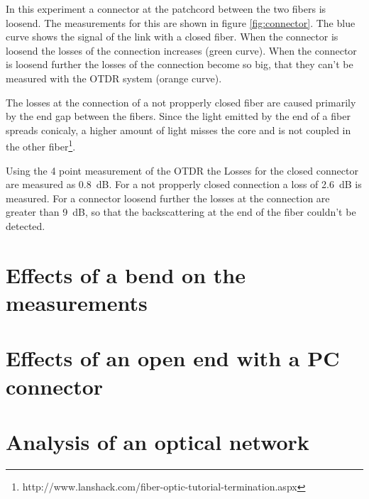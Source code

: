 In this experiment a connector at the patchcord between the two fibers is loosend. The measurements for this are shown in figure \ref{fig:connector}. The blue curve shows the signal of the link with a closed fiber. When the connector is loosend the losses of the connection increases (green curve). When the connector is loosend further the losses of the connection become so big, that they can't be measured with the OTDR system (orange curve). 

The losses at the connection of a not propperly closed fiber are caused primarily by the end gap between the fibers. Since the light emitted by the end of a fiber spreads conicaly, a higher amount of light misses the core and is not coupled in the other fiber\footnote[4]{http://www.lanshack.com/fiber-optic-tutorial-termination.aspx}.

Using the 4 point measurement of the OTDR the Losses for the closed connector are measured as 0.8~dB. For a not propperly closed connection a loss of 2.6~dB is measured. For a connector loosend further the losses at the connection are greater than 9~dB, so that the backscattering at the end of the fiber couldn't be detected.

\section{Effects of a bend on the measurements}



\section{Effects of an open end with a PC connector}

\section{Analysis of an optical network}



